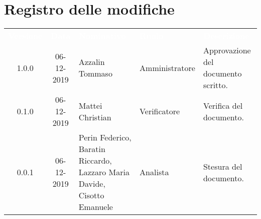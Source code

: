 \section*{Registro delle modifiche}
{
\renewcommand{\arraystretch}{1.5}
\centering
\begin{longtable}{ c c  C{4cm}  C{3cm} C{4cm}}
\textcolor{white}{\textbf{Versione}} & \textcolor{white}{\textbf{Data}} & \textcolor{white}{\textbf{Nominativo}} & \textcolor{white}{\textbf{Ruolo}} & \textcolor{white}{\textbf{Descrizione}}\\	


1.0.0 & 06-12-2019 & Azzalin Tommaso & Amministratore & Approvazione del documento scritto.  \\
		
0.1.0 & 06-12-2019 & Mattei Christian & Verificatore & Verifica del documento.  \\
		
0.0.1 & 06-12-2019 & Perin Federico, Baratin Riccardo, Lazzaro Maria Davide, Cisotto Emanuele & Analista & Stesura del documento.  \\
        

\end{longtable}
}